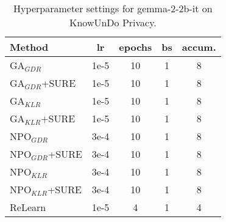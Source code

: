 \begin{table}[t]
    \centering
    \small
    \renewcommand{\arraystretch}{1.1}
    \setlength{\tabcolsep}{4pt}
    \begin{tabular}{l|c|c|c|c}
    \hline
    \textbf{Method} & \textbf{lr} & \textbf{epochs} & \textbf{bs} & \textbf{accum.} \\
    \hline
    GA$_{GDR}$ & 1e-5 & 10 & 1 & 8 \\
    GA$_{GDR}$+SURE & 1e-5 & 10 & 1 & 8 \\
    GA$_{KLR}$ & 1e-5 & 10 & 1 & 8 \\
    GA$_{KLR}$+SURE & 1e-5 & 10 & 1 & 8 \\
    NPO$_{GDR}$ & 3e-4 & 10 & 1 & 8 \\
    NPO$_{GDR}$+SURE & 3e-4 & 10 & 1 & 8 \\
    NPO$_{KLR}$ & 3e-4 & 10 & 1 & 8 \\
    NPO$_{KLR}$+SURE & 3e-4 & 10 & 1 & 8 \\
    ReLearn & 1e-5 & 4 & 1 & 4 \\
    \hline
    \end{tabular}
    \caption{Hyperparameter settings for gemma-2-2b-it on KnowUnDo Privacy.}
    \label{tab:hyparam_gemma}
\end{table}